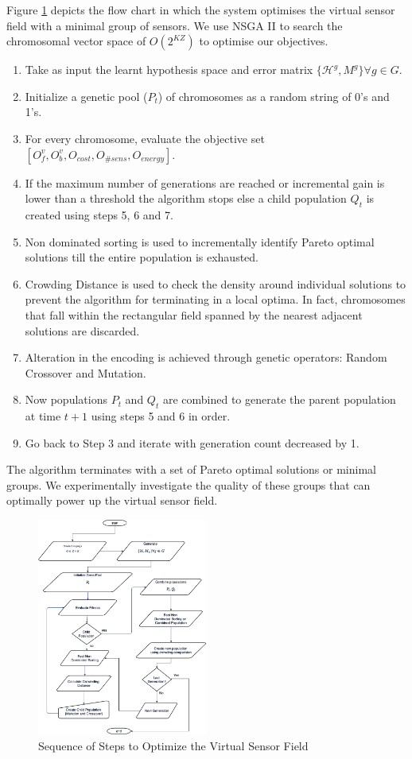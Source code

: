 Figure \ref{fig:ngisSchematic} depicts the flow chart in which the system optimises the virtual sensor field with a minimal group of sensors. We use NSGA II \cite{deb2002fast} to search the chromosomal vector space of $O(2^{KZ})$ to optimise our objectives. 
\begin{enumerate}
    \item Take as input the learnt hypothesis space and error matrix $\{\mathcal{H}^g, M^g\}  \forall g \in G$.
    \item Initialize a genetic pool ($P_t$) of chromosomes as a random string of 0's and 1's.
    \item For every chromosome, evaluate the objective set $[O^v_f, O^v_b,  O_{cost} ,  O_{\# sens}, O_{energy}]$.
    \item If the maximum number of generations are reached or incremental gain is lower than a threshold the algorithm stops else a child population $Q_t$ is created using steps 5, 6 and 7.
    \item Non dominated sorting is used to incrementally identify Pareto optimal solutions till the entire population is exhausted.
    \item Crowding Distance is used to check the density around individual solutions to prevent the algorithm for terminating in a local optima. In fact, chromosomes that fall within the rectangular field spanned by the nearest adjacent solutions are discarded.
    \item Alteration in the encoding is achieved through genetic operators: Random Crossover and Mutation.  
    \item Now populations $P_t$ and $Q_t$ are combined to generate the parent population at time $t+1$ using steps 5 and 6 in order.
    \item Go back to Step 3 and iterate with generation count decreased by 1.
\end{enumerate}
The algorithm terminates with a set of Pareto optimal solutions or minimal groups. 
We experimentally investigate the quality of these groups that can optimally power up the virtual sensor field.
 \begin{figure}
     \centering
     \includegraphics[width=0.5\textwidth]{img/ngisSchematic.png}
     \caption{Sequence of Steps to Optimize the Virtual Sensor Field }
     \label{fig:ngisSchematic}
 \end{figure}
